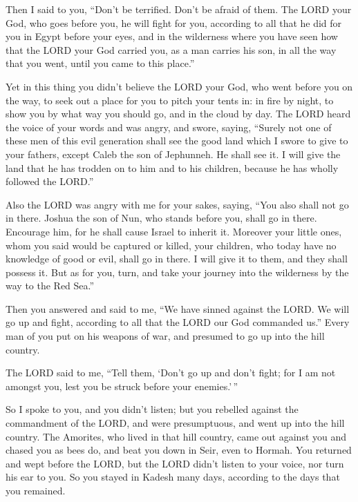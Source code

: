  Then I said to you, ``Don't be terrified. Don't be afraid
of them.  The LORD your God, who goes before you, he will
fight for you, according to all that he did for you in Egypt before your
eyes,  and in the wilderness where you have seen how that
the LORD your God carried you, as a man carries his son, in all the way
that you went, until you came to this place.''

 Yet in this thing you didn't believe the LORD your God,
 who went before you on the way, to seek out a place for
you to pitch your tents in: in fire by night, to show you by what way
you should go, and in the cloud by day.  The LORD heard the
voice of your words and was angry, and swore, saying, 
``Surely not one of these men of this evil generation shall see the good
land which I swore to give to your fathers,  except Caleb
the son of Jephunneh. He shall see it. I will give the land that he has
trodden on to him and to his children, because he has wholly followed
the LORD.''

 Also the LORD was angry with me for your sakes, saying,
``You also shall not go in there.  Joshua the son of Nun,
who stands before you, shall go in there. Encourage him, for he shall
cause Israel to inherit it.  Moreover your little ones,
whom you said would be captured or killed, your children, who today have
no knowledge of good or evil, shall go in there. I will give it to them,
and they shall possess it.  But as for you, turn, and take
your journey into the wilderness by the way to the Red Sea.''

 Then you answered and said to me, ``We have sinned against
the LORD. We will go up and fight, according to all that the LORD our
God commanded us.'' Every man of you put on his weapons of war, and
presumed to go up into the hill country.

 The LORD said to me, ``Tell them, `Don't go up and don't
fight; for I am not amongst you, lest you be struck before your
enemies.'\,''

 So I spoke to you, and you didn't listen; but you rebelled
against the commandment of the LORD, and were presumptuous, and went up
into the hill country.  The Amorites, who lived in that
hill country, came out against you and chased you as bees do, and beat
you down in Seir, even to Hormah.  You returned and wept
before the LORD, but the LORD didn't listen to your voice, nor turn his
ear to you.  So you stayed in Kadesh many days, according
to the days that you remained.

